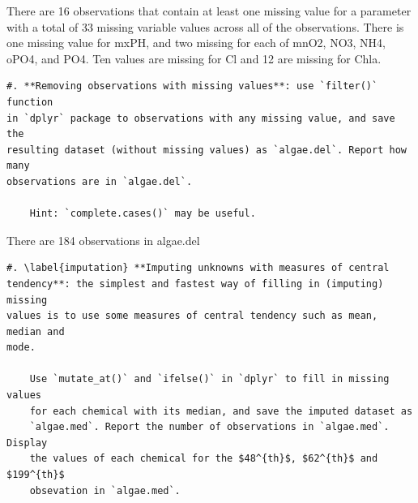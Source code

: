 \documentclass[]{article}
\newenvironment{Shaded}{\begin{snugshade}}{\end{snugshade}}
\newcommand{\KeywordTok}[1]{\textcolor[rgb]{0.13,0.29,0.53}{\textbf{#1}}}
\newcommand{\StringTok}[1]{\textcolor[rgb]{0.31,0.60,0.02}{#1}}
\newcommand{\ControlFlowTok}[1]{\textcolor[rgb]{0.13,0.29,0.53}{\textbf{#1}}}
\newcommand{\OperatorTok}[1]{\textcolor[rgb]{0.81,0.36,0.00}{\textbf{#1}}}
\newcommand{\NormalTok}[1]{#1}
\begin{document}
\begin{Shaded}
\end{Shaded}

There are 16 observations that contain at least one missing value for a
parameter with a total of 33 missing variable values across all of the
observations. There is one missing value for mxPH, and two missing for
each of mnO2, NO3, NH4, oPO4, and PO4. Ten values are missing for Cl and
12 are missing for Chla.

\begin{verbatim}
#. **Removing observations with missing values**: use `filter()` function
in `dplyr` package to observations with any missing value, and save the
resulting dataset (without missing values) as `algae.del`. Report how many
observations are in `algae.del`.

    Hint: `complete.cases()` may be useful.
\end{verbatim}

\begin{Shaded}
\end{Shaded}

There are 184 observations in algae.del

\begin{verbatim}
#. \label{imputation} **Imputing unknowns with measures of central
tendency**: the simplest and fastest way of filling in (imputing) missing
values is to use some measures of central tendency such as mean, median and
mode.
    
    Use `mutate_at()` and `ifelse()` in `dplyr` to fill in missing values
    for each chemical with its median, and save the imputed dataset as
    `algae.med`. Report the number of observations in `algae.med`.  Display
    the values of each chemical for the $48^{th}$, $62^{th}$ and $199^{th}$
    obsevation in `algae.med`. 
\end{verbatim}
\end{document}
